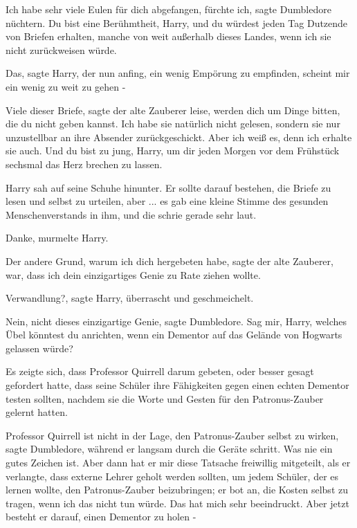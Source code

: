 \glqq{}Ich habe sehr viele Eulen für dich abgefangen, fürchte ich\grqq{}, sagte
Dumbledore nüchtern. \glqq{}Du bist eine Berühmtheit, Harry, und du würdest jeden
Tag Dutzende von Briefen erhalten, manche von weit außerhalb dieses Landes, wenn
ich sie nicht zurückweisen würde.\grqq{}

\glqq{}Das\grqq{}, sagte Harry, der nun anfing, ein wenig Empörung zu empfinden,
\glqq{}scheint mir ein wenig zu weit zu gehen -\grqq{}

\glqq{}Viele dieser Briefe\grqq{}, sagte der alte Zauberer leise, \glqq{}werden
dich um Dinge bitten, die du nicht geben kannst. Ich habe sie natürlich nicht
gelesen, sondern sie nur unzustellbar an ihre Absender zurückgeschickt. Aber ich
weiß es, denn ich erhalte sie auch. Und du bist zu jung, Harry, um dir jeden
Morgen vor dem Frühstück sechsmal das Herz brechen zu lassen.\grqq{}

Harry sah auf seine Schuhe hinunter. Er sollte darauf bestehen, die Briefe zu
lesen und selbst zu urteilen, aber ... es gab eine kleine Stimme des gesunden
Menschenverstands in ihm, und die schrie gerade sehr laut.

\glqq{}Danke\grqq{}, murmelte Harry.

\glqq{}Der andere Grund, warum ich dich hergebeten habe\grqq{}, sagte der alte
Zauberer, \glqq{}war, dass ich dein einzigartiges Genie zu Rate ziehen
wollte.\grqq{}

\glqq{}Verwandlung?\grqq{}, sagte Harry, überrascht und geschmeichelt.

\glqq{}Nein, nicht dieses einzigartige Genie\grqq{}, sagte Dumbledore. \glqq{}Sag
mir, Harry, welches Übel könntest du anrichten, wenn ein Dementor auf das
Gelände von Hogwarts gelassen würde?\grqq{}

Es zeigte sich, dass Professor Quirrell darum gebeten, oder besser gesagt
gefordert hatte, dass seine Schüler ihre Fähigkeiten gegen einen echten Dementor
testen sollten, nachdem sie die Worte und Gesten für den Patronus-Zauber gelernt
hatten.

\glqq{}Professor Quirrell ist nicht in der Lage, den Patronus-Zauber selbst zu
wirken\grqq{}, sagte Dumbledore, während er langsam durch die Geräte schritt.
\glqq{}Was nie ein gutes Zeichen ist. Aber dann hat er mir diese Tatsache
freiwillig mitgeteilt, als er verlangte, dass externe Lehrer geholt werden
sollten, um jedem Schüler, der es lernen wollte, den Patronus-Zauber
beizubringen; er bot an, die Kosten selbst zu tragen, wenn ich das nicht tun
würde. Das hat mich sehr beeindruckt. Aber jetzt besteht er darauf, einen
Dementor zu holen -\grqq{}

